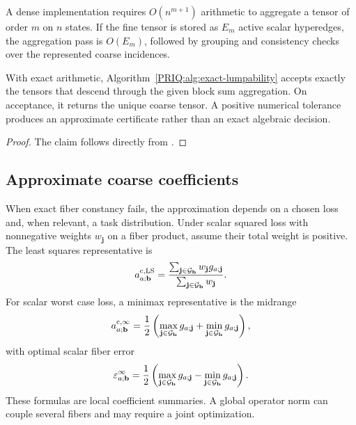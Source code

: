 A dense implementation requires $O(n^{m+1})$ arithmetic to aggregate a tensor of order $m$ on $n$ states.  If the fine tensor is stored as $E_m$ active scalar hyperedges, the aggregation pass is $O(E_m)$, followed by grouping and consistency checks over the represented coarse incidences.

\begin{PRIQproposition}\label{PRIQ:prop:algorithm-correctness}
With exact arithmetic, Algorithm~\ref{PRIQ:alg:exact-lumpability} accepts exactly the tensors that descend through the given block sum aggregation.  On acceptance, it returns the unique coarse tensor.  A positive numerical tolerance produces an approximate certificate rather than an exact algebraic decision.
\end{PRIQproposition}

\begin{proof}
The claim follows directly from .
\end{proof}

\subsection{Approximate coarse coefficients}
When exact fiber constancy fails, the approximation depends on a chosen loss and, when relevant, a task distribution.  Under scalar squared loss with nonnegative weights $w_{\mathbf j}$ on a fiber product, assume their total weight is positive.  The least squares representative is
\begin{equation}\label{PRIQ:eq:least-squares-coarse-coeff}
  a^{\mathrm c,\mathrm{LS}}_{a;\mathbf b}
  =
  \frac{
  \sum_{\mathbf j\in\mathcal G_{\mathbf b}}
  w_{\mathbf j}g_{a;\mathbf j}
  }{
  \sum_{\mathbf j\in\mathcal G_{\mathbf b}}w_{\mathbf j}
  }.
\end{equation}
For scalar worst case loss, a minimax representative is the midrange
\begin{equation}\label{PRIQ:eq:minimax-coarse-coeff}
  a^{\mathrm c,\infty}_{a;\mathbf b}
  =
  \frac12
  \left(
  \max_{\mathbf j\in\mathcal G_{\mathbf b}}g_{a;\mathbf j}
  +
  \min_{\mathbf j\in\mathcal G_{\mathbf b}}g_{a;\mathbf j}
  \right),
\end{equation}
with optimal scalar fiber error
\begin{equation}\label{PRIQ:eq:minimax-fiber-error}
  \varepsilon^{\infty}_{a;\mathbf b}
  =
  \frac12
  \left(
  \max_{\mathbf j\in\mathcal G_{\mathbf b}}g_{a;\mathbf j}
  -
  \min_{\mathbf j\in\mathcal G_{\mathbf b}}g_{a;\mathbf j}
  \right).
\end{equation}
These formulas are local coefficient summaries.  A global operator norm can couple several fibers and may require a joint optimization.

